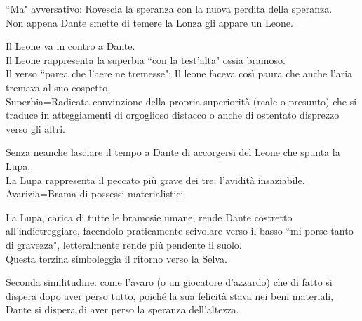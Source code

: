 \documentclass{article}
\begin{document}
``Ma" avversativo: Rovescia la speranza con la nuova perdita della speranza.\\
Non appena Dante smette di temere la Lonza gli appare un Leone.


Il Leone va in contro a Dante.\\
Il Leone rappresenta la superbia ``con la test'alta" ossia bramoso.\\
Il verso ``parea che l'aere ne tremesse": Il leone faceva così paura che anche l'aria tremava al suo cospetto.\\
Superbia=Radicata convinzione della propria superiorità (reale o presunto) che si traduce in atteggiamenti di orgoglioso distacco o anche di ostentato disprezzo verso gli altri.


Senza neanche lasciare il tempo a Dante di accorgersi del Leone che spunta la Lupa.\\
La Lupa rappresenta il peccato più grave dei tre: l'avidità insaziabile.\\
Avarizia=Brama di possessi materialistici.


La Lupa, carica di tutte le bramosie umane, rende Dante costretto all'indietreggiare, facendolo praticamente scivolare verso il basso ``mi porse tanto di gravezza", letteralmente rende più pendente il suolo.\\
Questa terzina simboleggia il ritorno verso la Selva.


Seconda similitudine: come l'avaro (o un giocatore d'azzardo) che di fatto si dispera dopo aver perso tutto, poiché la sua felicità stava nei beni materiali, Dante si dispera di aver perso la speranza dell'altezza.
\end{document}
